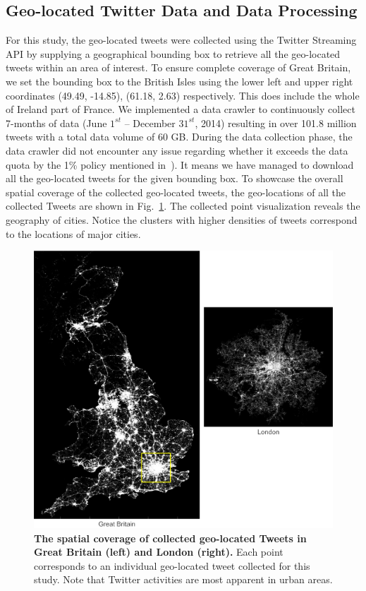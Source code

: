 \documentclass[]{tGIS2e}
\begin{document}
\subsection{Geo-located Twitter Data and Data Processing}
For this study, the geo-located tweets were collected using the Twitter Streaming API by supplying a geographical bounding box to retrieve all the  geo-located tweets within an area of interest. 
To ensure complete coverage of Great Britain, we set the bounding box to the British Isles using the lower left and upper right coordinates (49.49, -14.85), (61.18, 2.63) respectively. This does include the whole of Ireland part of France.
We implemented a data crawler to continuously collect 7-months of data (June $1^{st}$ -- December $31^{st}$, 2014) resulting in over 101.8 million tweets with a total data volume of 60 GB.
During the data collection phase, the data crawler did not encounter any issue regarding whether it exceeds the data quota by the 1\% policy mentioned in~\citep{hawelka}). It means we have managed to download all the geo-located tweets for the given bounding box.
To showcase the overall spatial coverage of the collected geo-located tweets, the geo-locations of all the collected Tweets are shown in Fig.~\ref{S2_Fig}.
The collected point visualization reveals the geography of cities.
Notice the clusters with higher densities of tweets correspond to the locations of major cities.

\begin{figure}[ht]
\begin{center}
\includegraphics[width=.9\linewidth]{./figure/S2_twitter_density_Fig_1}
\caption{{\bf The spatial coverage of collected geo-located Tweets in Great Britain (left) and London (right).} Each point corresponds to an individual geo-located tweet collected for this study. Note that Twitter activities are most apparent in urban areas.}
\label{S2_Fig}
\end{center}
\end{figure}
\end{document}
